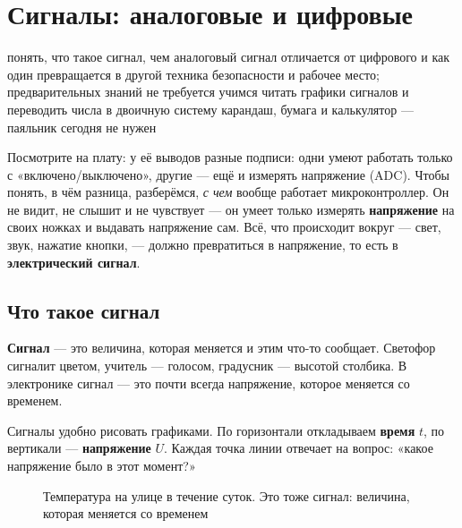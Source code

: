\begingroup
\renewcommand{\thefigure}{С.\arabic{figure}}
\renewcommand{\thetable}{С.\arabic{table}}
\renewcommand{\theHfigure}{intro-signals.\arabic{figure}}
\setcounter{figure}{0}\setcounter{table}{0}
\section*{Сигналы: аналоговые и цифровые}
\label{les:signals}
\lessonintro
  {понять, что такое сигнал, чем аналоговый сигнал отличается от цифрового и как один превращается в другой}
  {техника безопасности и рабочее место; предварительных знаний не требуется}
  {учимся читать графики сигналов и переводить числа в двоичную систему}
  {карандаш, бумага и калькулятор --- паяльник сегодня не нужен}

Посмотрите на плату: у её выводов разные подписи: одни умеют работать только
с «включено/выключено», другие --- ещё и измерять напряжение (ADC). Чтобы понять, в чём разница,
разберёмся, \emph{с чем} вообще работает микроконтроллер. Он не видит, не слышит и не чувствует --- он умеет только измерять
\textbf{напряжение} на своих ножках и выдавать напряжение сам. Всё, что происходит вокруг ---
свет, звук, нажатие кнопки, --- должно превратиться в напряжение, то есть в \textbf{электрический сигнал}.

\subsection*{Что такое сигнал}

\textbf{Сигнал} --- это величина, которая меняется и этим что-то сообщает. Светофор сигналит цветом,
учитель --- голосом, градусник --- высотой столбика. В электронике сигнал --- это почти всегда
напряжение, которое меняется со временем.

Сигналы удобно рисовать графиками. По горизонтали откладываем \textbf{время} $t$, по вертикали ---
\textbf{напряжение} $U$. Каждая точка линии отвечает на вопрос: «какое напряжение было в этот момент?»

\begin{figure}[H]
\centering
{}
\caption{Температура на улице в течение суток. Это тоже сигнал: величина, которая меняется со временем}
\end{figure}


